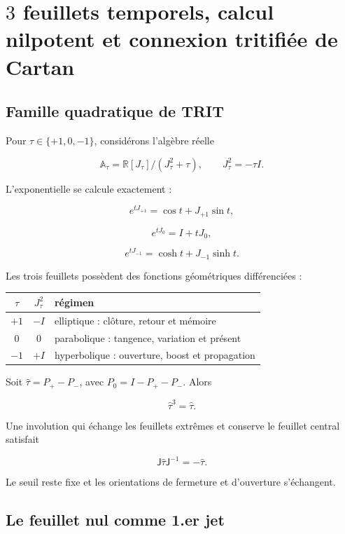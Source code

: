 \chapter{\(3\) feuillets temporels, calcul nilpotent et connexion tritifiée de Cartan}
\label{chap:tres-hojas-variacion}

\section{Famille quadratique de TRIT}

Pour \(\tau\in\{+1,0,-1\}\), considérons l'algèbre réelle

\[
\mathbb A_\tau=\mathbb R[J_\tau]/(J_\tau^2+\tau),
\qquad
J_\tau^2=-\tau I.
\]

L'exponentielle se calcule exactement :

\[
e^{tJ_{+1}}=\cos t+J_{+1}\sin t,
\]

\[
e^{tJ_0}=I+tJ_0,
\]

\[
e^{tJ_{-1}}=\cosh t+J_{-1}\sinh t.
\]

Les trois feuillets possèdent des fonctions géométriques différenciées :

\begin{center}
\begin{tabular}{ccl}
\toprule
\(\tau\)&\(J_\tau^2\)&r\'egimen\\
\midrule
\(+1\)&\(-I\)&elliptique : clôture, retour et mémoire\\
\(0\)&\(0\)&parabolique : tangence, variation et présent\\
\(-1\)&\(+I\)&hyperbolique : ouverture, boost et propagation\\
\bottomrule
\end{tabular}
\end{center}

Soit \(\widehat\tau=P_+-P_-\), avec \(P_0=I-P_+-P_-\). Alors

\[
\widehat\tau^3=\widehat\tau.
\]

Une involution qui échange les feuillets extrêmes et conserve le feuillet central
satisfait

\[
\mathsf J\widehat\tau\mathsf J^{-1}=-\widehat\tau.
\]

Le seuil reste fixe et les orientations de fermeture et d'ouverture
s'échangent.

\section{Le feuillet nul comme 1.er jet}


